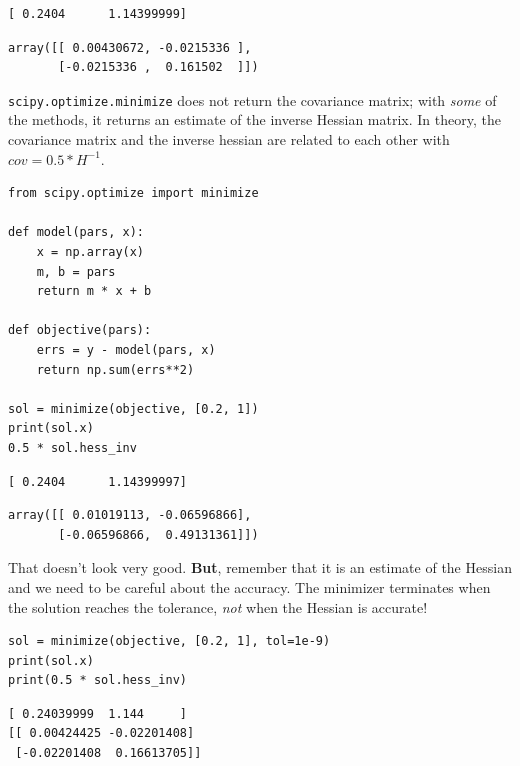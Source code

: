 \documentclass[11pt]{article}
\begin{document}
\begin{verbatim}
[ 0.2404      1.14399999]

\end{verbatim}

\begin{verbatim}
array([[ 0.00430672, -0.0215336 ],
       [-0.0215336 ,  0.161502  ]])
\end{verbatim}

\texttt{scipy.optimize.minimize} does not return the covariance matrix; with \emph{some} of the methods, it returns an estimate of the inverse Hessian matrix. In theory, the covariance matrix and the inverse hessian are related to each other with \(cov = 0.5 * H^{-1}\).

\begin{verbatim}
from scipy.optimize import minimize

def model(pars, x):
    x = np.array(x)
    m, b = pars
    return m * x + b

def objective(pars):
    errs = y - model(pars, x)
    return np.sum(errs**2)

sol = minimize(objective, [0.2, 1])
print(sol.x)
0.5 * sol.hess_inv
\end{verbatim}

\begin{verbatim}
[ 0.2404      1.14399997]

\end{verbatim}

\begin{verbatim}
array([[ 0.01019113, -0.06596866],
       [-0.06596866,  0.49131361]])
\end{verbatim}

That doesn't look very good. \textbf{But}, remember that it is an estimate of the Hessian and we need to be careful about the accuracy. The minimizer terminates when the solution reaches the tolerance, \emph{not} when the Hessian is accurate!

\begin{verbatim}
sol = minimize(objective, [0.2, 1], tol=1e-9)
print(sol.x)
print(0.5 * sol.hess_inv)
\end{verbatim}

\begin{verbatim}
[ 0.24039999  1.144     ]
[[ 0.00424425 -0.02201408]
 [-0.02201408  0.16613705]]

\end{verbatim}
\end{document}
